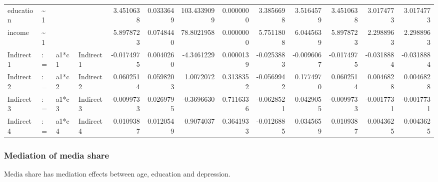 \documentclass[
]{article}
\begin{document}
\begin{table}[!h]
\begin{tabular}[t]{llllrrrrrrrrr}
\addlinespace
education & \textasciitilde{}1 &  &  & 3.4510638 & 0.0333649 & 103.4339099 & 0.0000000 & 3.3856698 & 3.5164579 & 3.4510638 & 3.0174773 & 3.0174773\\
income & \textasciitilde{}1 &  &  & 5.8978723 & 0.0748440 & 78.8021958 & 0.0000000 & 5.7511808 & 6.0445639 & 5.8978723 & 2.2988963 & 2.2988963\\
Indirect1 & := & a1*c1 & Indirect1 & -0.0174975 & 0.0040260 & -4.3461229 & 0.0000139 & -0.0253883 & -0.0096067 & -0.0174975 & -0.0318884 & -0.0318884\\
Indirect2 & := & a1*c2 & Indirect2 & 0.0602514 & 0.0598203 & 1.0072072 & 0.3138352 & -0.0569942 & 0.1774970 & 0.0602514 & 0.0046828 & 0.0046828\\
Indirect3 & := & a1*c3 & Indirect3 & -0.0099733 & 0.0269795 & -0.3696630 & 0.7116336 & -0.0628521 & 0.0429055 & -0.0099733 & -0.0017731 & -0.0017731\\
\addlinespace
Indirect4 & := & a1*c4 & Indirect4 & 0.0109387 & 0.0120549 & 0.9074037 & 0.3641933 & -0.0126885 & 0.0345659 & 0.0109387 & 0.0043625 & 0.0043625\\
\bottomrule
\end{tabular}
\end{table}

\hypertarget{mediation-of-media-share}{%
\subsubsection{Mediation of media
share}\label{mediation-of-media-share}}

Media share has mediation effects between age, education and depression.
\end{document}
